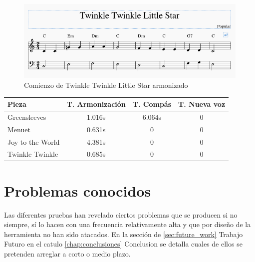         \begin{figure}
        	\centering
        	\includegraphics[width=0.8\linewidth]{imagenes/evaluation/twinkle_harm.png}
        	\caption{Comienzo de Twinkle Twinkle Little Star armonizado}
        	\label{fig:twinkle_harm}
        \end{figure}
  
  \begin{center}
  	\begin{tabular}{ | l | c | c | c | }
  		\hline
  		Pieza & T. Armonización & T. Compás & T. Nueva voz \\ \hline \hline
  		Greensleeves & 1.016s & 6.064s & 0 \\ \hline
  		Menuet & 0.631s & 0 & 0 \\ \hline
  		Joy to the World & 4.381s & 0 & 0 \\ \hline
  		Twinkle Twinkle & 0.685s & 0 & 0 \\ \hline
  	\end{tabular}
  \end{center}
  
  \section{Problemas conocidos}
  \label{sec:known_issues}
  Las diferentes pruebas han revelado ciertos problemas que se producen si no siempre, sí lo hacen con una frecuencia relativamente alta y que por diseño de la herramienta no han sido atacados. En la sección de \ref{sec:future_work} Trabajo Futuro en el catulo \ref{chap:conclusiones} Conclusion se detalla cuales de ellos se pretenden arreglar a corto o medio plazo.
  
